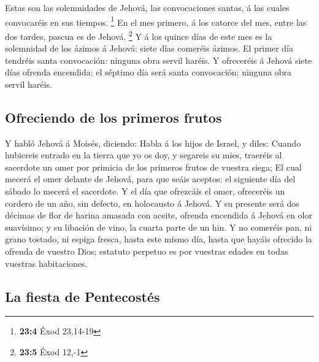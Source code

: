  Estas son las solemnidades de Jehová, las convocaciones
santas, á las cuales convocaréis en sus tiempos. \footnote{\textbf{23:4}
  Éxod 23,14-19}  En el mes primero, á los catorce del
mes, entre las dos tardes, pascua es de Jehová. \footnote{\textbf{23:5}
  Éxod 12,-1}  Y á los quince días de este mes es la
solemnidad de los ázimos á Jehová: siete días comeréis ázimos.
 El primer día tendréis santa convocación: ninguna obra
servil haréis.  Y ofreceréis á Jehová siete días ofrenda
encendida: el séptimo día será santa convocación; ninguna obra servil
haréis.

\hypertarget{ofreciendo-de-los-primeros-frutos}{%
\subsection{Ofreciendo de los primeros
frutos}\label{ofreciendo-de-los-primeros-frutos}}

 Y habló Jehová á Moisés, diciendo:  Habla
á los hijos de Israel, y diles: Cuando hubiereis entrado en la tierra
que yo os doy, y segareis su mies, traeréis al sacerdote un omer por
primicia de los primeros frutos de vuestra siega;  El
cual mecerá el omer delante de Jehová, para que seáis aceptos: el
siguiente día del sábado lo mecerá el sacerdote.  Y el
día que ofrezcáis el omer, ofreceréis un cordero de un año, sin defecto,
en holocausto á Jehová.  Y su presente será dos décimas
de flor de harina amasada con aceite, ofrenda encendida á Jehová en olor
suavísimo; y su libación de vino, la cuarta parte de un hin.
 Y no comeréis pan, ni grano tostado, ni espiga fresca,
hasta este mismo día, hasta que hayáis ofrecido la ofrenda de vuestro
Dios; estatuto perpetuo es por vuestras edades en todas vuestras
habitaciones.

\hypertarget{la-fiesta-de-pentecostuxe9s}{%
\subsection{La fiesta de
Pentecostés}\label{la-fiesta-de-pentecostuxe9s}}

